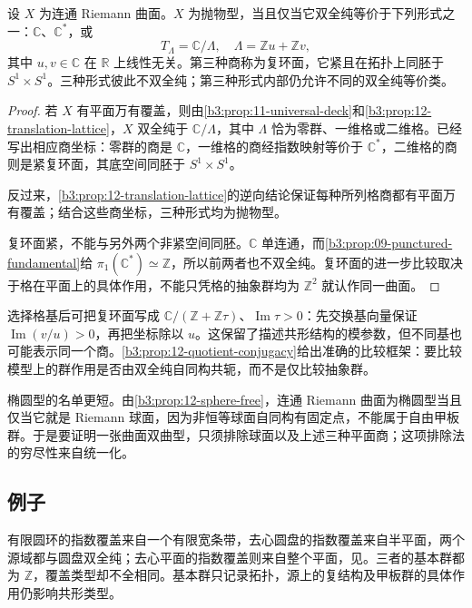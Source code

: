 \begin{proposition}[平面覆盖的商分类]\label{b3:prop:12-parabolic-classification}
设 \(X\) 为连通 Riemann 曲面。\(X\) 为抛物型，当且仅当它双全纯等价于下列形式之一：\(\mathbb C\)、\(\mathbb C^*\)，或
\[
 T_\Lambda=\mathbb C/\Lambda,\quad
 \Lambda=\mathbb Zu+\mathbb Zv,
\]
其中 \(u,v\in\mathbb C\) 在 \(\mathbb R\) 上线性无关。第三种商称为复环面，它紧且在拓扑上同胚于 \(S^1\times S^1\)。三种形式彼此不双全纯；第三种形式内部仍允许不同的双全纯等价类。
\end{proposition}
\begin{proof}
若 \(X\) 有平面万有覆盖，则由\cref{b3:prop:11-universal-deck}和\cref{b3:prop:12-translation-lattice}，\(X\) 双全纯于 \(\mathbb C/\Lambda\)，其中 \(\Lambda\) 恰为零群、一维格或二维格。已经写出相应商坐标：零群的商是 \(\mathbb C\)，一维格的商经指数映射等价于 \(\mathbb C^*\)，二维格的商则是紧复环面，其底空间同胚于 \(S^1\times S^1\)。

反过来，\cref{b3:prop:12-translation-lattice}的逆向结论保证每种所列格商都有平面万有覆盖；结合这些商坐标，三种形式均为抛物型。

复环面紧，不能与另外两个非紧空间同胚。\(\mathbb C\) 单连通，而\cref{b3:prop:09-punctured-fundamental}给 \(\pi_1(\mathbb C^*)\simeq\mathbb Z\)，所以前两者也不双全纯。复环面的进一步比较取决于格在平面上的具体作用，不能只凭格的抽象群均为 \(\mathbb Z^2\) 就认作同一曲面。
\end{proof}

选择格基后可把复环面写成 \(\mathbb C/(\mathbb Z+\mathbb Z\tau)\)、\(\operatorname{Im}\tau>0\)：先交换基向量保证 \(\operatorname{Im}(v/u)>0\)，再把坐标除以 \(u\)。这保留了描述共形结构的模参数，但不同基也可能表示同一个商。\cref{b3:prop:12-quotient-conjugacy}给出准确的比较框架：要比较模型上的群作用是否由双全纯自同构共轭，而不是仅比较抽象群。

\ProseParagraphBreak
椭圆型的名单更短。由\cref{b3:prop:12-sphere-free}，连通 Riemann 曲面为椭圆型当且仅当它就是 Riemann 球面，因为非恒等球面自同构有固定点，不能属于自由甲板群。于是要证明一张曲面双曲型，只须排除球面以及上述三种平面商；这项排除法的穷尽性来自统一化。

\subsection{例子}
\label{b3:subsec:120303}

有限圆环的指数覆盖来自一个有限宽条带，去心圆盘的指数覆盖来自半平面，两个源域都与圆盘双全纯；去心平面的指数覆盖则来自整个平面，见。三者的基本群都为 \(\mathbb Z\)，覆盖类型却不全相同。基本群只记录拓扑，源上的复结构及甲板群的具体作用仍影响共形类型。

